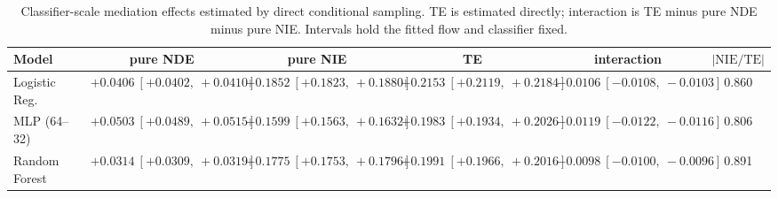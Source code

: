 \begin{table}[htbp]
  \centering
  \caption{Classifier-scale mediation effects estimated by direct conditional sampling. TE is estimated directly; interaction is TE minus pure NDE minus pure NIE. Intervals hold the fitted flow and classifier fixed.}
  \label{tab:german_synth_gap_overall}
  \begin{tabular}{lccccc}
    \toprule
    Model & pure NDE & pure NIE & TE & interaction & $|\mathrm{NIE}/\mathrm{TE}|$ \\
    \midrule
    Logistic Reg. & $+0.0406\ [+0.0402,\ +0.0410]$ & $+0.1852\ [+0.1823,\ +0.1880]$ & $+0.2153\ [+0.2119,\ +0.2184]$ & $-0.0106\ [-0.0108,\ -0.0103]$ & 0.860 \\
    MLP (64--32) & $+0.0503\ [+0.0489,\ +0.0515]$ & $+0.1599\ [+0.1563,\ +0.1632]$ & $+0.1983\ [+0.1934,\ +0.2026]$ & $-0.0119\ [-0.0122,\ -0.0116]$ & 0.806 \\
    Random Forest & $+0.0314\ [+0.0309,\ +0.0319]$ & $+0.1775\ [+0.1753,\ +0.1796]$ & $+0.1991\ [+0.1966,\ +0.2016]$ & $-0.0098\ [-0.0100,\ -0.0096]$ & 0.891 \\
    \bottomrule
  \end{tabular}
\end{table}